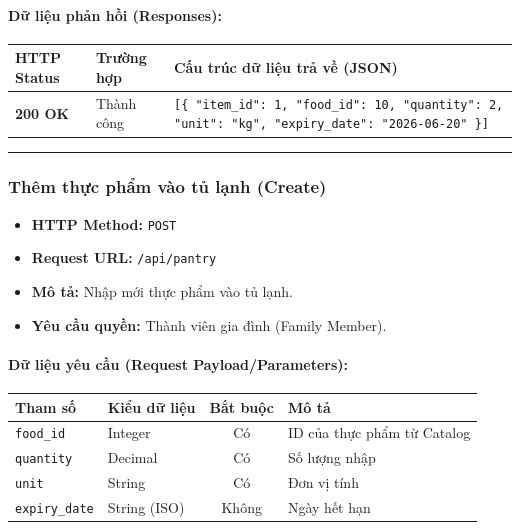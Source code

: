 \documentclass[12pt,a4paper]{article}
\begin{document}
\paragraph{Dữ liệu phản hồi (Responses):}
\begin{longtable}{|>{\raggedright\arraybackslash}p{2.8cm}|>{\raggedright\arraybackslash}p{3.2cm}|>{\raggedright\arraybackslash}p{8.0cm}|}
\hline
\textbf{HTTP Status} & \textbf{Trường hợp} & \textbf{Cấu trúc dữ liệu trả về (JSON)} \\ \hline
\endhead
\textbf{200 OK} & Thành công & \texttt{[\{ "item\_id": 1, "food\_id": 10, "quantity": 2, "unit": "kg", "expiry\_date": "2026-06-20" \}]} \\ \hline
\end{longtable}

\vskip 0.4cm
\noindent\rule{\textwidth}{0.3pt}
\vskip 0.4cm

\subsubsection{Thêm thực phẩm vào tủ lạnh (Create)}
\begin{itemize}[leftmargin=*]
    \item \textbf{HTTP Method:} \texttt{POST}
    \item \textbf{Request URL:} \texttt{/api/pantry}
    \item \textbf{Mô tả:} Nhập mới thực phẩm vào tủ lạnh.
    \item \textbf{Yêu cầu quyền:} Thành viên gia đình (Family Member).
\end{itemize}

\paragraph{Dữ liệu yêu cầu (Request Payload/Parameters):}
\begin{longtable}{|>{\raggedright\arraybackslash}p{2.8cm}|>{\raggedright\arraybackslash}p{2.2cm}|c|>{\raggedright\arraybackslash}p{7.0cm}|}
\hline
\textbf{Tham số} & \textbf{Kiểu dữ liệu} & \textbf{Bắt buộc} & \textbf{Mô tả} \\ \hline
\endhead
\texttt{food\_id} & Integer & Có & ID của thực phẩm từ Catalog \\ \hline
\texttt{quantity} & Decimal & Có & Số lượng nhập \\ \hline
\texttt{unit} & String & Có & Đơn vị tính \\ \hline
\texttt{expiry\_date} & String (ISO) & Không & Ngày hết hạn \\ \hline
\end{longtable}
\end{document}
